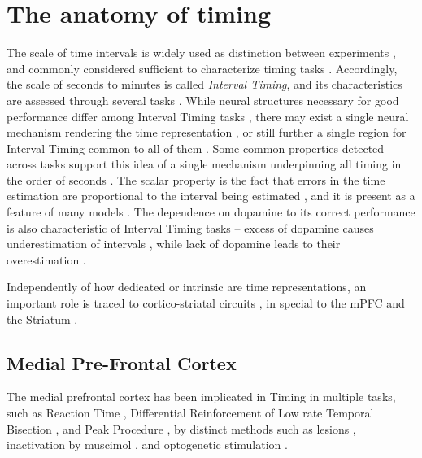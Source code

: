 \section{The anatomy of timing}
\label{sub:anatomy}
    
    The scale of time intervals is widely used as distinction between experiments \cite{van20168, buhusi2005makes, hardy2016neurocomputational}, and commonly considered sufficient to characterize timing tasks \cite{buhusi2005makes}. Accordingly, the scale of seconds to minutes is called \textit{Interval Timing}, and its characteristics are assessed through several tasks \cite{lloyd2012neural,astrand2014comparison,brea2016prospective,mello2015scalable,gouvea2015striatal,kopec2018controlling,gershman2014dopamine,tiganj2016sequential,narayanan2009delay,cho2010differential}. While neural structures necessary for good performance differ among Interval Timing tasks \cite{paton2018neural}, there may exist a single neural mechanism rendering the time representation \cite{gibbon1977scalar}, or still further a single region for Interval Timing common to all of them \cite{mello2015scalable}. Some common properties detected across tasks support this idea of a single mechanism underpinning all timing in the order of seconds \cite{buhusi2005makes, gibbon1977scalar}. The scalar property is the fact that errors in the time estimation are  proportional to the interval being estimated \cite{oprisan2014all}, and it is present as a feature of many models \cite{gibbon1977scalar, oprisan2014all}. The dependence on dopamine to its correct performance is also characteristic of Interval Timing tasks \cite{kim2017optogenetic, meck2012gene} -- excess of dopamine causes underestimation of intervals \cite{cheng2016clock, pine2010dopamine}, while lack of dopamine leads to their overestimation \cite{drew2003effects}. 
    
    Independently of how dedicated or intrinsic are time representations, an important role is traced to cortico-striatal circuits \cite{lusk2016utilizing, buhusi2005makes, meck2008cortico}, in special to the mPFC \cite{buhusi2018inactivation} and the Striatum \cite{mello2015scalable}.
        
    \subsection{Medial Pre-Frontal Cortex}
        The medial prefrontal cortex has been implicated in Timing in multiple tasks, such as Reaction Time \cite{narayanan2009delay}, Differential Reinforcement of Low rate \cite{cho2010differential} Temporal Bisection \cite{kim2009inactivation,tiganj2016sequential,kim2013neural}, and Peak Procedure \cite{buhusi2018inactivation}, by distinct methods such as lesions \cite{cho2010differential}, inactivation by muscimol \cite{buhusi2018inactivation, kim2009inactivation}, and optogenetic stimulation \cite{kim2017optogenetic}.
        

